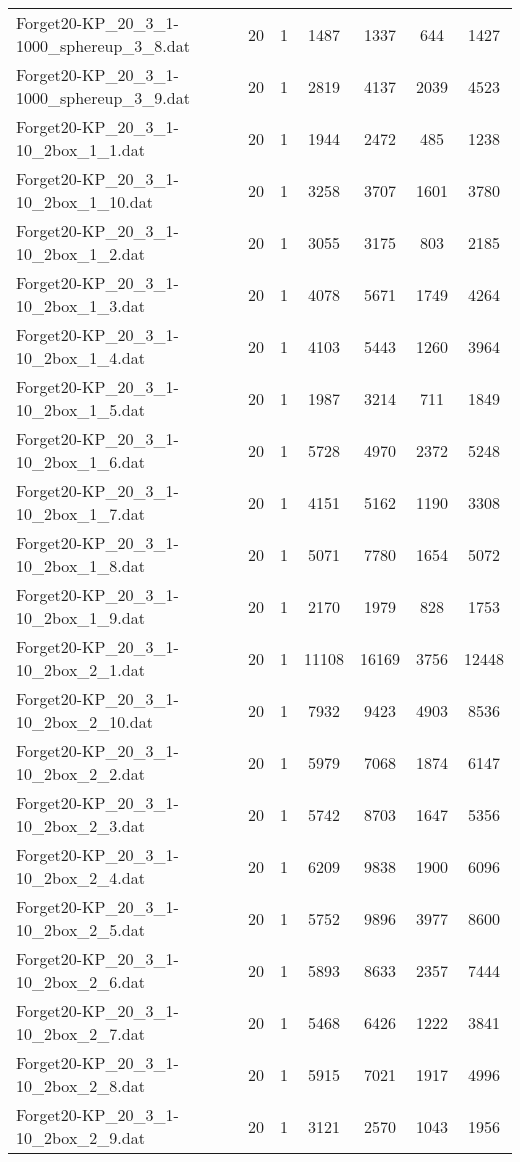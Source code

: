 \begin{table}[!ht]
\begin{tabular}{lcccccc}
Forget20-KP\_20\_3\_1-1000\_sphereup\_3\_8.dat & 20 & 1 & 1487 & 1337 & 644 & 1427 \\
Forget20-KP\_20\_3\_1-1000\_sphereup\_3\_9.dat & 20 & 1 & 2819 & 4137 & 2039 & 4523 \\
Forget20-KP\_20\_3\_1-10\_2box\_1\_1.dat & 20 & 1 & 1944 & 2472 & 485 & 1238 \\
Forget20-KP\_20\_3\_1-10\_2box\_1\_10.dat & 20 & 1 & 3258 & 3707 & 1601 & 3780 \\
Forget20-KP\_20\_3\_1-10\_2box\_1\_2.dat & 20 & 1 & 3055 & 3175 & 803 & 2185 \\
Forget20-KP\_20\_3\_1-10\_2box\_1\_3.dat & 20 & 1 & 4078 & 5671 & 1749 & 4264 \\
Forget20-KP\_20\_3\_1-10\_2box\_1\_4.dat & 20 & 1 & 4103 & 5443 & 1260 & 3964 \\
Forget20-KP\_20\_3\_1-10\_2box\_1\_5.dat & 20 & 1 & 1987 & 3214 & 711 & 1849 \\
Forget20-KP\_20\_3\_1-10\_2box\_1\_6.dat & 20 & 1 & 5728 & 4970 & 2372 & 5248 \\
Forget20-KP\_20\_3\_1-10\_2box\_1\_7.dat & 20 & 1 & 4151 & 5162 & 1190 & 3308 \\
Forget20-KP\_20\_3\_1-10\_2box\_1\_8.dat & 20 & 1 & 5071 & 7780 & 1654 & 5072 \\
Forget20-KP\_20\_3\_1-10\_2box\_1\_9.dat & 20 & 1 & 2170 & 1979 & 828 & 1753 \\
Forget20-KP\_20\_3\_1-10\_2box\_2\_1.dat & 20 & 1 & 11108 & 16169 & 3756 & 12448 \\
Forget20-KP\_20\_3\_1-10\_2box\_2\_10.dat & 20 & 1 & 7932 & 9423 & 4903 & 8536 \\
Forget20-KP\_20\_3\_1-10\_2box\_2\_2.dat & 20 & 1 & 5979 & 7068 & 1874 & 6147 \\
Forget20-KP\_20\_3\_1-10\_2box\_2\_3.dat & 20 & 1 & 5742 & 8703 & 1647 & 5356 \\
Forget20-KP\_20\_3\_1-10\_2box\_2\_4.dat & 20 & 1 & 6209 & 9838 & 1900 & 6096 \\
Forget20-KP\_20\_3\_1-10\_2box\_2\_5.dat & 20 & 1 & 5752 & 9896 & 3977 & 8600 \\
Forget20-KP\_20\_3\_1-10\_2box\_2\_6.dat & 20 & 1 & 5893 & 8633 & 2357 & 7444 \\
Forget20-KP\_20\_3\_1-10\_2box\_2\_7.dat & 20 & 1 & 5468 & 6426 & 1222 & 3841 \\
Forget20-KP\_20\_3\_1-10\_2box\_2\_8.dat & 20 & 1 & 5915 & 7021 & 1917 & 4996 \\
Forget20-KP\_20\_3\_1-10\_2box\_2\_9.dat & 20 & 1 & 3121 & 2570 & 1043 & 1956 \\

\end{tabular}
\end{table}
